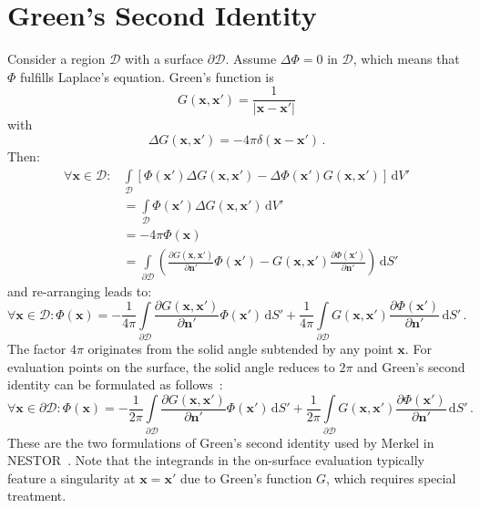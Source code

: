 \section{Green's Second Identity}
Consider a region $\mathcal{D}$ with a surface $\partial\mathcal{D}$.
Assume $\Delta \Phi = 0$ in $\mathcal{D}$, which means that $\Phi$ fulfills Laplace's equation.
Green's function is
\begin{equation}
  G(\mathbf{x}, \mathbf{x}') = \frac{1}{|\mathbf{x}-\mathbf{x}'|} \label{eqn:GreensFunction}
\end{equation}
with
\begin{equation*}
  \Delta G(\mathbf{x}, \mathbf{x}') = -4 \pi \delta(\mathbf{x}-\mathbf{x}') \, .
\end{equation*}
Then:
\begin{align*}
  \forall \mathbf{x} \in \mathcal{D}: & \int\limits_\mathcal{D} \left[ \Phi(\mathbf{x}') \Delta G(\mathbf{x},\mathbf{x}')
                                - \Delta \Phi(\mathbf{x}') G(\mathbf{x},\mathbf{x}') \right] \,\mathrm{d}V' \\
  ~ & = \int\limits_\mathcal{D} \Phi(\mathbf{x}') \Delta G(\mathbf{x},\mathbf{x}') \,\mathrm{d}V' \\
  ~ & = -4 \pi \Phi(\mathbf{x}) \\
  ~ & = \int\limits_{\partial\mathcal{D}} \left(\frac{\partial G(\mathbf{x}, \mathbf{x}')}{\partial \mathbf{n}'} \Phi(\mathbf{x}')
            - G(\mathbf{x}, \mathbf{x}') \frac{\partial \Phi(\mathbf{x}')}{\partial \mathbf{n}'}     \right)  \,\mathrm{d}S'
\end{align*}
and re-arranging leads to:
\begin{equation}
  \forall \mathbf{x} \in \mathcal{D} :
  \Phi(\mathbf{x}) =
  - \frac{1}{4 \pi} \int\limits_{\partial\mathcal{D}} \frac{\partial G(\mathbf{x}, \mathbf{x}')}{\partial \mathbf{n}'} \Phi(\mathbf{x}') \,\mathrm{d}S'
  + \frac{1}{4 \pi} \int\limits_{\partial\mathcal{D}} G(\mathbf{x}, \mathbf{x}') \frac{\partial \Phi(\mathbf{x}')}{\partial \mathbf{n}'} \,\mathrm{d}S' \, .
  \label{eqn:GreensIdentityOffSurface}
\end{equation}
The factor $4 \pi$ originates from the solid angle subtended by any point $\mathbf{x}$.
For evaluation points on the surface, the solid angle reduces to $2 \pi$ and Green's second identity can be formulated as follows~\cite{martensen_potentialtheorie, roy_2007}:
\begin{equation}
  \forall \mathbf{x} \in \partial\mathcal{D}:
  \Phi(\mathbf{x}) =
  - \frac{1}{2 \pi} \int\limits_{\partial\mathcal{D}} \frac{\partial G(\mathbf{x}, \mathbf{x}')}{\partial \mathbf{n}'} \Phi(\mathbf{x}') \,\mathrm{d}S'
  + \frac{1}{2 \pi} \int\limits_{\partial\mathcal{D}} G(\mathbf{x}, \mathbf{x}') \frac{\partial \Phi(\mathbf{x}')}{\partial \mathbf{n}'} \,\mathrm{d}S' \, .
  \label{eqn:GreensIdentityOnSurface}
\end{equation}
These are the two formulations of Green's second identity used by Merkel in NESTOR~\cite{merkel_1986}.
Note that the integrands in the on-surface evaluation typically feature a singularity at $\mathbf{x} = \mathbf{x}'$
due to Green's function $G$, which requires special treatment.

